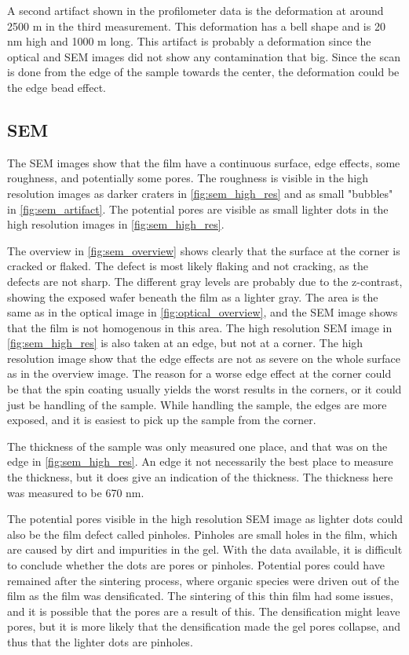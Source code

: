 A second artifact shown in the profilometer data is the deformation at around 2500 \textmu m in the third measurement.
This deformation has a bell shape and is 20 nm high and 1000 \textmu m long.
This artifact is probably a deformation since the optical and SEM images did not show any contamination that big.
Since the scan is done from the edge of the sample towards the center, the deformation could be the edge bead effect.

\subsection{SEM}

\noindent The SEM images show that the film have a continuous surface, edge effects, some roughness, and potentially some pores.
The roughness is visible in the high resolution images as darker craters in \autoref{fig:sem_high_res} and as small "bubbles" in \autoref{fig:sem_artifact}.
The potential pores are visible as small lighter dots in the high resolution images in \autoref{fig:sem_high_res}.

The overview in \autoref{fig:sem_overview} shows clearly that the surface at the corner is cracked or flaked.
The defect is most likely flaking and not cracking, as the defects are not sharp.
The different gray levels are probably due to the z-contrast, showing the exposed wafer beneath the film as a lighter gray.
The area is the same as in the optical image in \autoref{fig:optical_overview}, and the SEM image shows that the film is not homogenous in this area.
The high resolution SEM image in \autoref{fig:sem_high_res} is also taken at an edge, but not at a corner.
The high resolution image show that the edge effects are not as severe on the whole surface as in the overview image.
The reason for a worse edge effect at the corner could be that the spin coating usually yields the worst results in the corners, or it could just be handling of the sample.
While handling the sample, the edges are more exposed, and it is easiest to pick up the sample from the corner.

The thickness of the sample was only measured one place, and that was on the edge in \autoref{fig:sem_high_res}.
An edge it not necessarily the best place to measure the thickness, but it does give an indication of the thickness.
The thickness here was measured to be 670 nm.


The potential pores visible in the high resolution SEM image as lighter dots could also be the film defect called pinholes.
Pinholes are small holes in the film, which are caused by dirt and impurities in the gel.
With the data available, it is difficult to conclude whether the dots are pores or pinholes.
Potential pores could have remained after the sintering process, where organic species were driven out of the film as the film was densificated.
The sintering of this thin film had some issues, and it is possible that the pores are a result of this.
The densification might leave pores, but it is more likely that the densification made the gel pores collapse, and thus that the lighter dots are pinholes.

